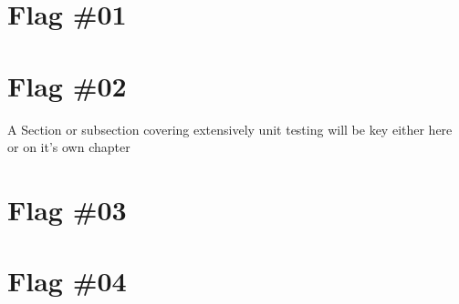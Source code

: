 


\section{Flag \#01}



\section{Flag \#02}

%

A Section or subsection covering extensively unit testing will be key either here or on it's own chapter
\newpage

\section{Flag \#03}

%
\newpage


\section{Flag \#04}


%

\newpage

